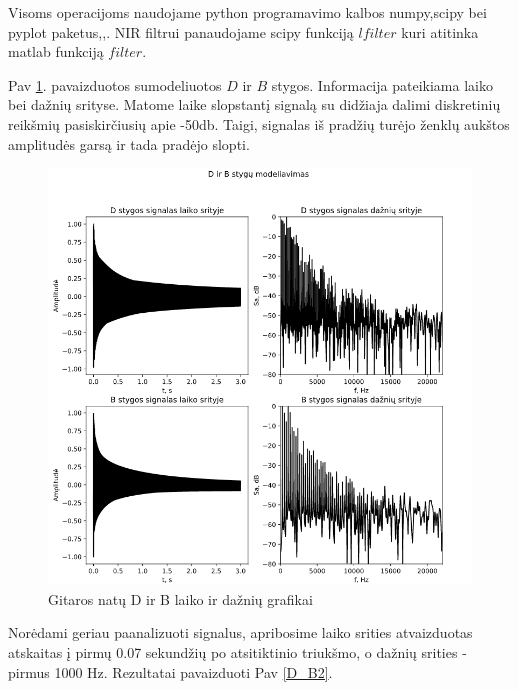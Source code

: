 \documentclass[10pt,a4paper,twocolumn]{article}
\begin{document}
Visoms operacijoms naudojame python programavimo kalbos numpy,scipy bei pyplot paketus\cite{numpy},\cite{scipy},\cite{pyplot}. NIR filtrui panaudojame scipy funkciją $lfilter$ \cite{lfilter} kuri atitinka matlab funkciją $filter$.

Pav \ref{D_B}. pavaizduotos sumodeliuotos $D$ ir $B$ stygos. Informacija pateikiama laiko bei dažnių srityse. Matome laike slopstantį signalą su didžiaja dalimi diskretinių reikšmių pasiskirčiusių apie -50db. Taigi, signalas iš pradžių turėjo ženklų aukštos amplitudės garsą ir tada pradėjo slopti.

\begin{figure} %
	[!h]
	\centering
	\includegraphics*[width=.9\columnwidth]{d_b.png} %
	\caption{Gitaros natų D ir B laiko ir dažnių grafikai}
	\label{D_B}
	\vspace{6pt}
\end{figure}


Norėdami geriau paanalizuoti signalus, apribosime laiko srities atvaizduotas atskaitas į pirmų 0.07 sekundžių po atsitiktinio triukšmo, o dažnių srities - pirmus 1000 Hz. Rezultatai pavaizduoti Pav \ref{D_B2}.
\end{document}
